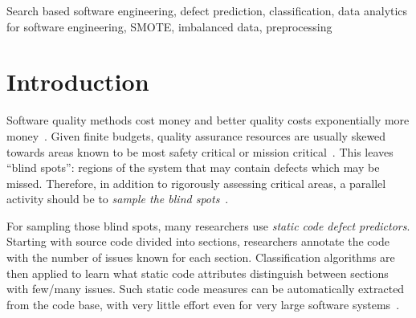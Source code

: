 \documentclass[10pt,conference]{IEEEtran}
\theoremstyle{break}
\theoremstyle{break}
\begin{document}
\begin{IEEEkeywords}
Search based software engineering,
defect prediction, classification, 
data analytics for software engineering, SMOTE,  imbalanced data, preprocessing
\end{IEEEkeywords}

\IEEEpeerreviewmaketitle


\section{Introduction}
\label{sect:intro}
Software quality methods cost money and better quality costs exponentially more money~\cite{voas95,fu2016tuning}.  
Given finite budgets, quality assurance resources are usually 
skewed towards areas known to be most safety critical or mission critical~\cite{lowryBK98}. This leaves ``blind spots'': regions of the system that may contain defects which may be missed. Therefore, in addition to rigorously assessing  critical areas, a parallel activity should be to {\em sample the blind spots}~\cite{Menzies04}. 

For sampling those blind spots, many researchers  use  {\em static code defect predictors}.
Starting with source code divided into sections, researchers annotate the code with the number of issues known for each section.
Classification algorithms are then applied to learn what static code attributes
distinguish 
between sections with few/many issues.
Such static code measures can be automatically extracted from
the code base, with very little effort even for very large software
systems~\cite{Nagappan:2005}.  
\end{document}
